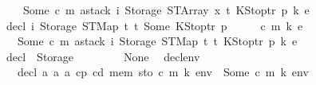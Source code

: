 \begin{isabellebody}
\ \ \ \ Some\ {\isacharparenleft}{\kern0pt}c{\isacharcomma}{\kern0pt}\ m{\isacharcomma}{\kern0pt}\ astack\ i\ {\isacharparenleft}{\kern0pt}Storage\ {\isacharparenleft}{\kern0pt}STArray\ x\ t{\isacharparenright}{\kern0pt}{\isacharparenright}{\kern0pt}\ {\isacharparenleft}{\kern0pt}KStoptr\ p{\isacharparenright}{\kern0pt}\ {\isacharparenleft}{\kern0pt}k{\isacharcomma}{\kern0pt}\ e{\isacharparenright}{\kern0pt}{\isacharparenright}{\kern0pt}{\isachardoublequoteclose}\isanewline
{\isacharbar}{\kern0pt}\ {\isachardoublequoteopen}decl\ i\ {\isacharparenleft}{\kern0pt}Storage\ {\isacharparenleft}{\kern0pt}STMap\ t\ t{\isacharprime}{\kern0pt}{\isacharparenright}{\kern0pt}{\isacharparenright}{\kern0pt}\ {\isacharparenleft}{\kern0pt}Some\ {\isacharparenleft}{\kern0pt}KStoptr\ p{\isacharcomma}{\kern0pt}\ {\isacharunderscore}{\kern0pt}{\isacharparenright}{\kern0pt}{\isacharparenright}{\kern0pt}\ {\isacharunderscore}{\kern0pt}\ {\isacharunderscore}{\kern0pt}\ {\isacharunderscore}{\kern0pt}\ {\isacharunderscore}{\kern0pt}\ {\isacharparenleft}{\kern0pt}c{\isacharcomma}{\kern0pt}\ m{\isacharcomma}{\kern0pt}\ k{\isacharcomma}{\kern0pt}\ e{\isacharparenright}{\kern0pt}\ {\isacharequal}{\kern0pt}\isanewline
\ \ \ Some\ {\isacharparenleft}{\kern0pt}c{\isacharcomma}{\kern0pt}\ m{\isacharcomma}{\kern0pt}\ astack\ i\ {\isacharparenleft}{\kern0pt}Storage\ {\isacharparenleft}{\kern0pt}STMap\ t\ t{\isacharprime}{\kern0pt}{\isacharparenright}{\kern0pt}{\isacharparenright}{\kern0pt}\ {\isacharparenleft}{\kern0pt}KStoptr\ p{\isacharparenright}{\kern0pt}\ {\isacharparenleft}{\kern0pt}k{\isacharcomma}{\kern0pt}\ e{\isacharparenright}{\kern0pt}{\isacharparenright}{\kern0pt}{\isachardoublequoteclose}\isanewline
{\isacharbar}{\kern0pt}\ {\isachardoublequoteopen}decl\ {\isacharunderscore}{\kern0pt}\ {\isacharparenleft}{\kern0pt}Storage\ {\isacharunderscore}{\kern0pt}{\isacharparenright}{\kern0pt}\ {\isacharunderscore}{\kern0pt}\ {\isacharunderscore}{\kern0pt}\ {\isacharunderscore}{\kern0pt}\ {\isacharunderscore}{\kern0pt}\ {\isacharunderscore}{\kern0pt}\ {\isacharunderscore}{\kern0pt}\ {\isacharequal}{\kern0pt}\ None{\isachardoublequoteclose}\ \isanewline
\isanewline
{}\isamarkupfalse%
\ decl{\isacharunderscore}{\kern0pt}env{\isacharcolon}{\kern0pt}\isanewline
\ \ \ {\isachardoublequoteopen}decl\ a{}\ a{}\ a{}\ cp\ cd\ mem\ sto\ {\isacharparenleft}{\kern0pt}c{\isacharcomma}{\kern0pt}\ m{\isacharcomma}{\kern0pt}\ k{\isacharcomma}{\kern0pt}\ env{\isacharparenright}{\kern0pt}\ {\isacharequal}{\kern0pt}\ Some\ {\isacharparenleft}{\kern0pt}c{\isacharprime}{\kern0pt}{\isacharcomma}{\kern0pt}\ m{\isacharprime}{\kern0pt}{\isacharcomma}{\kern0pt}\ k{\isacharprime}{\kern0pt}{\isacharcomma}{\kern0pt}\ env{\isacharprime}{\kern0pt}{\isacharparenright}{\kern0pt}{\isachardoublequoteclose}\isanewline

\end{isabellebody}
